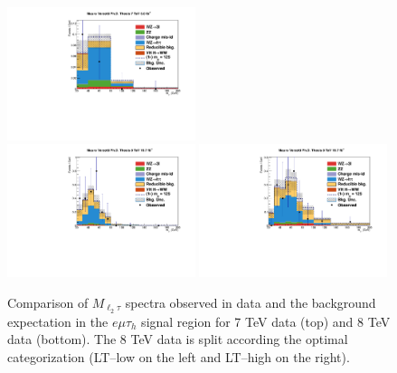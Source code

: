\begin{figure}
\begin{center}
  \includegraphics[width=0.49\textwidth]{4_Analisys/pics/7TeV/plots/emt/LTCut/final-subMass-LTCut.pdf}\\
  \includegraphics[width=0.49\textwidth]{4_Analisys/pics/8TeV/plots/emt/LTLow/final-subMass-LTLow.pdf}
  \includegraphics[width=0.49\textwidth]{4_Analisys/pics/8TeV/plots/emt/LTHigh/final-subMass-LTHigh.pdf}\\
  \caption{
    Comparison of $M_{\ell_2\tau}$ spectra observed in data and the background expectation %
  in the $e\mu\tau_h$ signal region for 7 TeV data (top) and 8 TeV data (bottom). The 8 TeV data is split according the optimal categorization (LT--low on the left and LT--high on the right).
  }
  \label{fig:LLT_emt_prefit}
\end{center}
\end{figure}

